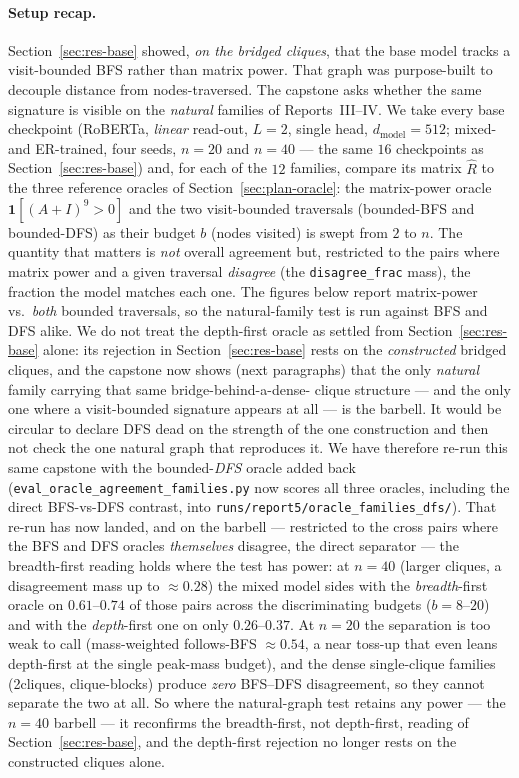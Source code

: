 \documentclass[11pt,a4paper]{article}
\begin{document}
\paragraph{Setup recap.} Section~\ref{sec:res-base} showed, \emph{on the bridged cliques}, that
the base model tracks a visit-bounded BFS rather than matrix power. That graph was purpose-built
to decouple distance from nodes-traversed. The capstone asks whether the same signature is visible
on the \emph{natural} families of Reports~III--IV. We take every base checkpoint (RoBERTa,
\emph{linear} read-out, $L=2$, single head, $d_{\mathrm{model}}=512$; mixed- and ER-trained, four
seeds, $n=20$ and $n=40$ --- the same $16$ checkpoints as Section~\ref{sec:res-base}) and, for each
of the $12$ families, compare its matrix $\hat R$ to the three reference oracles of
Section~\ref{sec:plan-oracle}: the matrix-power oracle $\mathbf 1[(A+I)^{9}>0]$ and the two
visit-bounded traversals (bounded-BFS and bounded-DFS) as their budget $b$ (nodes visited) is swept
from $2$ to $n$. The quantity that matters is \emph{not} overall agreement but, restricted to the
pairs where matrix power and a given traversal \emph{disagree} (the \texttt{disagree\_frac} mass),
the fraction the model matches each one. The figures below report matrix-power vs.\ \emph{both}
bounded traversals, so the natural-family test is run against BFS and DFS alike. We do not treat the
depth-first oracle as settled from Section~\ref{sec:res-base} alone: its rejection
in Section~\ref{sec:res-base} rests on the \emph{constructed} bridged cliques, and the capstone now
shows (next paragraphs) that the only \emph{natural} family carrying that same bridge-behind-a-dense-
clique structure --- and the only one where a visit-bounded signature appears at all --- is the
barbell. It would be circular to declare DFS dead on the strength of the one construction and then
not check the one natural graph that reproduces it. We have therefore re-run this same capstone with
the bounded-\emph{DFS} oracle added back (\texttt{eval\_oracle\_agreement\_families.py} now scores all
three oracles, including the direct BFS-vs-DFS contrast, into
\texttt{runs/report5/oracle\_families\_dfs/}). That re-run has now landed, and on the barbell ---
restricted to the cross pairs where the BFS and DFS oracles \emph{themselves} disagree, the direct
separator --- the breadth-first reading holds where the test has power: at $n=40$ (larger cliques, a
disagreement mass up to $\approx0.28$) the mixed model sides with the \emph{breadth}-first oracle on
$0.61$--$0.74$ of those pairs across the discriminating budgets ($b=8$--$20$) and with the
\emph{depth}-first one on only $0.26$--$0.37$. At $n=20$ the separation is too weak to call
(mass-weighted follows-BFS $\approx0.54$, a near toss-up that even leans depth-first at the single
peak-mass budget), and the dense single-clique families (2cliques, clique-blocks) produce \emph{zero}
BFS--DFS disagreement, so they cannot separate the two at all. So where the natural-graph test retains
any power --- the $n=40$ barbell --- it reconfirms the breadth-first, not depth-first, reading of
Section~\ref{sec:res-base}, and the depth-first rejection no longer rests on the constructed cliques
alone.
\end{document}
